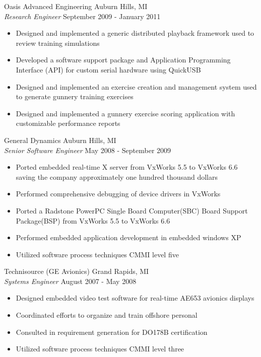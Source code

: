 \documentclass[line]{res}
\begin{document}
\begin{resume}
    \vspace{-2mm}
    Oasis Advanced Engineering \hfill Auburn Hills, MI\\
    {\sl Research Engineer} \hfill September 2009 - January 2011
    \vspace{1mm}
    \begin{itemize} 
       \item Designed and implemented a generic distributed playback framework
         used to review training simulations
       \item Developed a software support package and Application Programming
         Interface (API) for custom serial hardware using QuickUSB   
       \item Designed and implemented an exercise creation and management system used
         to generate gunnery training exercises 
       \item Designed and implemented a gunnery exercise scoring application with customizable performance reports
    \end{itemize}

    \vspace{-2mm}
    General Dynamics \hfill Auburn Hills, MI\\
    {\sl Senior Software Engineer} \hfill May 2008 - September 2009
    \vspace{1mm}
    \begin{itemize} 
       \item Ported embedded real-time X server from VxWorks 5.5 to
         VxWorks 6.6 saving the company approximately one hundred thousand dollars
       \item Performed comprehensive debugging of device drivers in VxWorks
       \item Ported a Radstone PowerPC Single Board Computer(SBC) Board Support
         Package(BSP) from VxWorks 5.5 to VxWorks 6.6
       \item Performed embedded application development in embedded windows XP
       \item Utilized software process techniques CMMI level five
    \end{itemize}

    \vspace{-2mm}
    Technisource (GE Avionics) \hfill Grand Rapids, MI\\
    {\sl Systems Engineer} \hfill August 2007 - May 2008
    \vspace{1mm}
    \begin{itemize} 
      \item Designed embedded video test software for real-time AE653
        avionics displays
      \item Coordinated efforts to organize and train offshore personal
      \item Consulted in requirement generation for DO178B certification
      \item Utilized software process techniques CMMI level three
    \end{itemize}


\end{resume}
\end{document}
